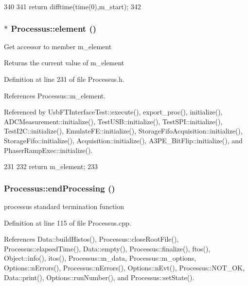 \begin{DoxyCode}
340                        {
341     return difftime(time(0),m_start);
342   }
\end{DoxyCode}
\hypertarget{classProcessus_a6fe155527431a7190b7d44d600b9608d}{
\subsubsection[{element}]{$\ast$ Processus::element ()}}
\label{classProcessus_a6fe155527431a7190b7d44d600b9608d}
Get accessor to member m\_\-element \begin{DoxyReturn}{Returns}
the current value of m\_\-element 
\end{DoxyReturn}


Definition at line 231 of file Processus.h.

References Processus::m\_\-element.

Referenced by UsbFTInterfaceTest::execute(), export\_\-proc(), initialize(), ADCMeasurement::initialize(), TestUSB::initialize(), TestSPI::initialize(), TestI2C::initialize(), EmulateFE::initialize(), StorageFifoAcquisition::initialize(), StorageFifo::initialize(), Acquisition::initialize(), A3PE\_\-BitFlip::initialize(), and PhaserRampExec::initialize().


\begin{DoxyCode}
231                       {
232     return m_element;
233   }
\end{DoxyCode}
\hypertarget{classProcessus_a5e4da662989d356b89d490b89c7afbfd}{
\subsubsection[{endProcessing}]{ Processus::endProcessing ()}}
\label{classProcessus_a5e4da662989d356b89d490b89c7afbfd}
processus standard termination function 

Definition at line 115 of file Processus.cpp.

References Data::buildHistos(), Processus::closeRootFile(), Processus::elapsedTime(), Data::empty(), Processus::finalize(), ftos(), Object::info(), itos(), Processus::m\_\-data, Processus::m\_\-options, Options::nErrors(), Processus::nErrors(), Options::nEvt(), Processus::NOT\_\-OK, Data::print(), Options::runNumber(), and Processus::setState().

